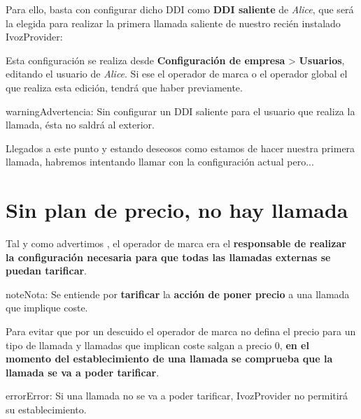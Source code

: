 \documentclass[letterpaper,10pt,spanish]{sphinxmanual}
\begin{document}
Para ello, basta con configurar dicho DDI como \textbf{DDI saliente} de \emph{Alice}, que será la elegida para realizar la primera llamada saliente de nuestro recién instalado IvozProvider:

\noindent{}

Esta configuración se realiza desde \textbf{Configuración de empresa} \textgreater{} \textbf{Usuarios}, editando el usuario de \emph{Alice}. Si ese el operador de marca o el operador global el que realiza esta edición, tendrá que haber {\hyperref[internal_calls/brand_portal:emulate\string-company]{}} previamente.

\begin{notice}{warning}{Advertencia:}
Sin configurar un DDI saliente para el usuario que realiza la llamada, ésta no saldrá al exterior.
\end{notice}

Llegados a este punto y estando deseosos como estamos de hacer nuestra primera llamada, habremos intentando llamar con la configuración actual pero...


\section{Sin plan de precio, no hay llamada}
\label{external_outgoing_calls/noplan_nocall:noplan-nocall}\label{external_outgoing_calls/noplan_nocall:sin-plan-de-precio-no-hay-llamada}\label{external_outgoing_calls/noplan_nocall::doc}
Tal y como advertimos {\hyperref[operation_roles/index:brand\string-responsibilities]{}}, el operador de marca era el \textbf{responsable de realizar la configuración necesaria para que todas las llamadas externas se puedan tarificar}.

\begin{notice}{note}{Nota:}
Se entiende por \textbf{tarificar} la \textbf{acción de poner precio} a una llamada que implique coste.
\end{notice}

Para evitar que por un descuido el operador de marca no defina el precio para un tipo de llamada y llamadas que implican coste salgan a precio 0, \textbf{en el momento del establecimiento de una llamada se comprueba que la llamada se va a poder tarificar}.

\begin{notice}{error}{Error:}
Si una llamada no se va a poder tarificar, IvozProvider no permitirá su establecimiento.
\end{notice}
\end{document}
